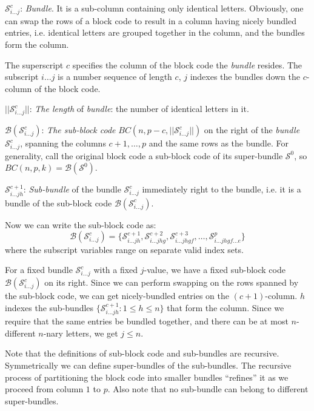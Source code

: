 \documentclass[12pt]{article}  %
\begin{document}
$\mathcal{S}^c_{i\dots j}$: \emph{Bundle}. It is a sub-column containing only identical letters. Obviously, one can swap the rows of a block code to result in a column having nicely bundled entries, i.e. identical letters are grouped together in the column, and the bundles form the column.


The superscript $c$ specifies the column of the block code the \emph{bundle} resides. The subscript $i\dots j$ is a number sequence of length $c$, $j$ indexes the bundles down the $c$-column of the block code.



$||\mathcal{S}^c_{i\dots j}||$: \emph{The length} of \emph{bundle}: the number of identical letters in it.


$\mathcal{B}(\mathcal{S}^c_{i\dots j})$: \emph{The sub-block code} $BC(n, p-c, ||\mathcal{S}^c_{i\dots j}||)$ on the right of the \emph{bundle} $\mathcal{S}^c_{i\dots j}$, spanning the columns $c+1,\dots,p$ and the same rows as the bundle. For generality, call the original block code a sub-block code of its super-bundle $\mathcal{S}^0$, so $BC(n,p,k) = \mathcal{B}(\mathcal{S}^0)$.


$\mathcal{S}^{c+1}_{i\dots j h}$: \emph{Sub-bundle} of the bundle $\mathcal{S}^c_{i\dots j}$ immediately right to the bundle, i.e. it is a bundle of the sub-block code $\mathcal{B}(\mathcal{S}^c_{i\dots j})$.

Now we can write the sub-block code as:
$$\mathcal{B}(\mathcal{S}^c_{i\dots j}) = \{
\mathcal{S}^{c+1}_{i\dots j h}, 
\mathcal{S}^{c+2}_{i\dots j h g}, 
\mathcal{S}^{c+3}_{i\dots j h g f}, 
\dots, 
\mathcal{S}^{p}_{i\dots j h g f \dots e}
\}$$
where the subscript variables range on separate valid index sets.

For a fixed bundle $\mathcal{S}^c_{i\dots j}$ with a fixed $j$-value, we have a fixed sub-block code $\mathcal{B}(\mathcal{S}^c_{i\dots j})$ on its right. Since we can perform swapping on the rows spanned by the sub-block code, we can get nicely-bundled entries on the $(c+1)$-column. $h$ indexes the sub-bundles $\{\mathcal{S}^{c+1}_{i\dots j h} : 1 \leq h \leq n \}$ that form the column. Since we require that the same entries be bundled together, and there can be at most $n$-different $n$-nary letters, we get $j \leq n$.


Note that the definitions of sub-block code and sub-bundles are recursive. Symmetrically we can define super-bundles of the sub-bundles. The recursive process of partitioning the block code into smaller bundles ``refines'' it as we proceed from column $1$ to $p$. Also note that no sub-bundle can belong to different super-bundles. 
\end{document}
